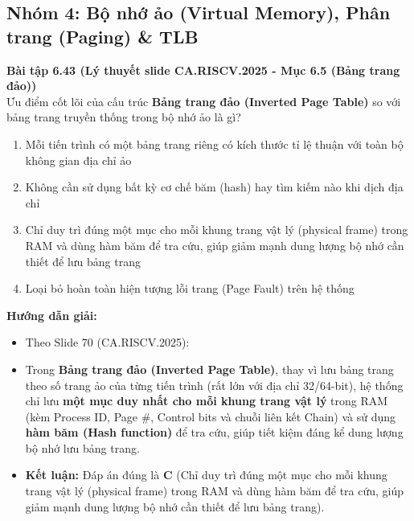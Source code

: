 \subsection{Nhóm 4: Bộ nhớ ảo (Virtual Memory), Phân trang (Paging) \& TLB}

\textbf{Bài tập 6.43 (Lý thuyết slide CA.RISCV.2025 - Mục 6.5 (Bảng trang đảo))}\\
Ưu điểm cốt lõi của cấu trúc \textbf{Bảng trang đảo (Inverted Page Table)} so với bảng trang truyền thống trong bộ nhớ ảo là gì?
\begin{enumerate}[label=\Alph*.]
    \item Mỗi tiến trình có một bảng trang riêng có kích thước tỉ lệ thuận với toàn bộ không gian địa chỉ ảo
    \item Không cần sử dụng bất kỳ cơ chế băm (hash) hay tìm kiếm nào khi dịch địa chỉ
    \item Chỉ duy trì đúng một mục cho mỗi khung trang vật lý (physical frame) trong RAM và dùng hàm băm để tra cứu, giúp giảm mạnh dung lượng bộ nhớ cần thiết để lưu bảng trang
    \item Loại bỏ hoàn toàn hiện tượng lỗi trang (Page Fault) trên hệ thống
\end{enumerate}
\textbf{Hướng dẫn giải:}
\begin{itemize}
    \item Theo Slide 70 (CA.RISCV.2025):
    \item Trong \textbf{Bảng trang đảo (Inverted Page Table)}, thay vì lưu bảng trang theo số trang ảo của từng tiến trình (rất lớn với địa chỉ 32/64-bit), hệ thống chỉ lưu \textbf{một mục duy nhất cho mỗi khung trang vật lý} trong RAM (kèm Process ID, Page \#, Control bits và chuỗi liên kết Chain) và sử dụng \textbf{hàm băm (Hash function)} để tra cứu, giúp tiết kiệm đáng kể dung lượng bộ nhớ lưu bảng trang.
    \item \textbf{Kết luận:} Đáp án đúng là \textbf{C} (Chỉ duy trì đúng một mục cho mỗi khung trang vật lý (physical frame) trong RAM và dùng hàm băm để tra cứu, giúp giảm mạnh dung lượng bộ nhớ cần thiết để lưu bảng trang).
\end{itemize}


